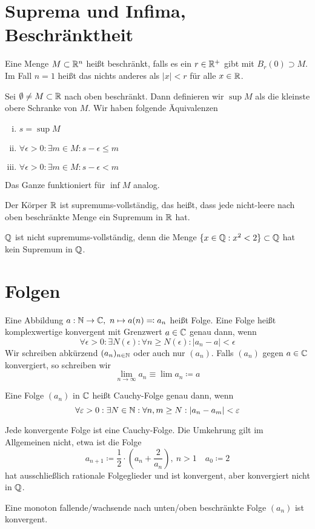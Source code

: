 \section*{Suprema und Infima, Beschränktheit}
\begin{defn}
    Eine Menge $M\subset \mathbb{R}^n$ heißt beschränkt, falls es ein $r\in \mathbb{R}^+$ gibt mit $B_r(0)\supset M$. Im Fall $n=1$ heißt das nichts anderes als $\vert x\vert < r$ für alle $x\in \mathbb{R}$.
\end{defn}
\begin{defn}
    Sei $\emptyset\neq M\subset \mathbb{R}$ nach oben beschränkt. Dann definieren wir $\sup M$ als die kleinste obere Schranke von $M$. Wir haben
    folgende Äquivalenzen
    \begin{enumerate}[(i)]
        \item $s = \sup M$
        \item $\forall \epsilon > 0: \exists m\in M: s-\epsilon \le m$
        \item $\forall \epsilon > 0: \exists m\in M: s-\epsilon < m$
    \end{enumerate}
\end{defn}
Das Ganze funktioniert für $\inf M$ analog. 
\begin{satz} Der Körper $\mathbb{R}$ ist supremums-vollständig, das heißt, dass jede nicht-leere nach oben beschränkte Menge ein Supremum
    in $\mathbb{R}$ hat.
\end{satz}
\begin{bem}
    $\mathbb{Q}$ ist nicht supremums-vollständig, denn die Menge $\{x\in \mathbb{Q}:x^2<2\}\subset \mathbb{Q}$ hat kein Supremum in $\mathbb{Q}$. 
\end{bem}
\section*{Folgen}
\begin{defn}
    Eine Abbildung $a:\mathbb{N}\to \mathbb{C}, \ n\mapsto a(n) \eqqcolon a_n$ heißt Folge. Eine Folge heißt komplexwertige
    konvergent mit Grenzwert $a\in \mathbb{C}$ genau dann, wenn 
    \[
    \forall \epsilon >0 : \exists N(\epsilon) : \forall n\ge N(\epsilon) : \vert a_n -a \vert < \epsilon    
    \] 
    Wir schreiben abkürzend $(a_n)_{n\in \mathbb{N}}$ oder auch nur $(a_n)$. Falls $(a_n)$ gegen $a\in \mathbb{C}$ konvergiert, so schreiben wir 
    \[
        \lim_{n\to \infty} a_n \equiv \lim a_n \coloneqq a
    \]
\end{defn}
\begin{defn}
    Eine Folge $(a_n)$ in $\mathbb{C}$ heißt Cauchy-Folge genau dann, wenn 
    \[
    \forall \varepsilon > 0: \exists N\in \mathbb{N}:\forall n,m \ge N: \vert a_n -a_m \vert <\varepsilon    
    \]
\end{defn}
\begin{bem} Jede konvergente Folge ist eine Cauchy-Folge. Die Umkehrung gilt im Allgemeinen nicht, etwa ist die Folge 
    \[
    a_{n+1} \coloneqq \frac{1}{2}\cdot \left( a_n + \frac{2}{a_n}\right), \ n>1 \quad a_0 \coloneqq 2     
    \]
    hat ausschließlich rationale Folgeglieder und ist konvergent, aber konvergiert nicht in $\mathbb{Q}$.
\end{bem}

\begin{lemma}
    Eine monoton fallende/wachsende nach unten/oben beschränkte Folge $(a_n)$ ist konvergent. 
\end{lemma}